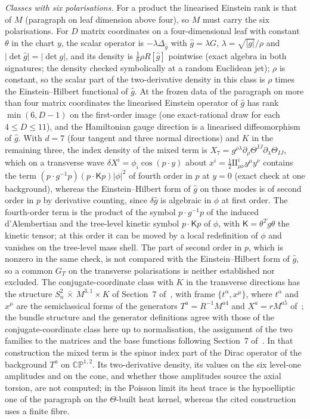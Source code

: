 \emph{Classes with six polarisations.} For a product the linearised Einstein rank is that of \(M\) (paragraph on leaf dimension above four), so \(M\) must carry the six polarisations. For \(D\) matrix coordinates on a four-dimensional leaf with constant \(\theta\) in the chart \(y\), the scalar operator is \(-\lambda\Delta_{\hat g}\) with \(\hat g=\lambda G\), \(\lambda=\sqrt{\lvert g\rvert}/\rho\) and \(\lvert\det\hat g\rvert=\lvert\det g\rvert\), and its density is \(\tfrac16\rho R[\hat g]\) pointwise (exact algebra in both signatures; the density checked symbolically at a random Euclidean jet); \(\rho\) is constant, so the scalar part of the two-derivative density in this class is \(\rho\) times the Einstein--Hilbert functional of \(\hat g\). At the frozen data of the paragraph on more than four matrix coordinates the linearised Einstein operator of \(\hat g\) has rank \(\min(6,D-1)\) on the first-order image (one exact-rational draw for each \(4\le D\le11\)), and the Hamiltonian gauge direction is a linearised diffeomorphism of \(\hat g\). With \(d=7\) (four tangent and three normal directions) and \(K\) in the remaining three, the index density of the mixed term is \(X_7=g^{\rho\lambda}\partial_\rho\Theta^{IJ}\partial_\lambda\Theta_{IJ}\), which on a transverse wave \(\delta X^i=\phi_i\cos(p\cdot y)\) about \(x^i=\tfrac12\mathrm{II}^i_{\mu\nu}y^\mu y^\nu\) contains the term \((p\cdot g^{-1}p)(p\cdot\mathsf Kp)\lvert\phi\rvert^2\) of fourth order in \(p\) at \(y=0\) (exact check at one background), whereas the Einstein--Hilbert form of \(\hat g\) on those modes is of second order in \(p\) by derivative counting, since \(\delta\hat g\) is algebraic in \(\phi\) at first order. The fourth-order term is the product of the symbol \(p\cdot g^{-1}p\) of the induced d'Alembertian and the tree-level kinetic symbol \(p\cdot\mathsf K p\) of \(\phi\), with \(\mathsf K=\theta^{T}g\theta\) the kinetic tensor; at this order it can be moved by a local redefinition of \(\phi\) and vanishes on the tree-level mass shell. The part of second order in \(p\), which is nonzero in the same check, is not compared with the Einstein--Hilbert form of \(\hat g\), so a common \(G_T\) on the transverse polarisations is neither established nor excluded. The conjugate-coordinate class with \(K\) in the transverse directions has the structure \(S^2_n\,\bar\times\,M^{3,1}\times K\) of Section~7 of~\cite{Steinacker2023}, with frame \(\{t^\alpha,x^\mu\}\), where \(t^\alpha\) and \(x^\mu\) are the semiclassical forms of the generators \(T^a=R^{-1}M^{a4}\) and \(X^a=rM^{a5}\) of~\cite{SperlingSteinacker2019}; the bundle structure and the generator definitions agree with those of the conjugate-coordinate class here up to normalisation, the assignment of the two families to the matrices and the base functions following Section~7 of~\cite{Steinacker2023}. In that construction the mixed term is the spinor index part of the Dirac operator of the background \(T^a\) on \(\mathbb{CP}^{1,2}\). Its two-derivative density, its values on the six level-one amplitudes and on the cone, and whether those amplitudes source the axial torsion, are not computed; in the Poisson limit its heat trace is the hypoelliptic one of the paragraph on the \(\Theta\)-built heat kernel, whereas the cited construction uses a finite fibre.

